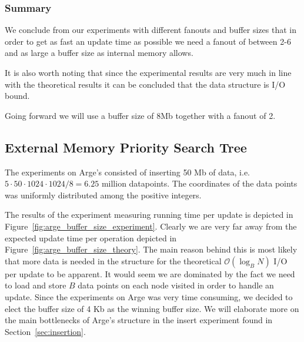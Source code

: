\documentclass[twoside,11pt,openright]{report}
\begin{document}
\clearpage

\subsubsection*{Summary}

We conclude from our experiments with different fanouts and buffer sizes that in order to get as fast an update time as possible we need a fanout of between 2-6 and as large a buffer size as internal memory allows.

It is also worth noting that since the experimental results are very much in line with the theoretical results it can be concluded that the data structure is I/O bound.

Going forward we will use a buffer size of 8Mb together with a fanout of 2. 

\subsection{External Memory Priority Search Tree}
\label{subsec:tuning_arge}

The experiments on Arge's consisted of inserting 50 Mb of data, i.e. $5 \cdot 50 \cdot 1024 \cdot 1024 / 8 = 6.25$ million datapoints. The coordinates of the data points was uniformly distributed among the positive integers. 

The results of the experiment measuring running time per update is depicted in Figure~\ref{fig:arge_buffer_size_experiment}. Clearly we are very far away from the expected update time per operation depicted in Figure~\ref{fig:arge_buffer_size_theory}. The main reason behind this is most likely that more data is needed in the structure for the theoretical $\mathcal{O}(\log_B N)$ I/O per update to be apparent. It would seem we are dominated by the fact we need to load and store $B$ data points on each node visited in order to handle an update. Since the experiments on Arge was very time consuming, we decided to elect the buffer size of 4 Kb as the winning buffer size. We will elaborate more on the main bottlenecks of Arge's structure in the insert experiment found in Section~\ref{sec:insertion}.
\end{document}
